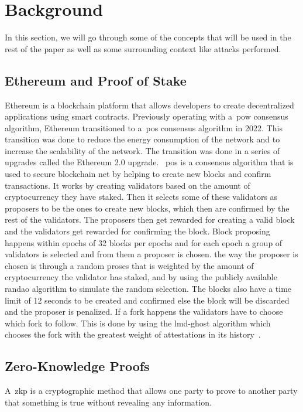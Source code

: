 
\section{Background}\label{sec:background}
In this section, we will go through some of the concepts that will be used in the rest of the paper as well as some surrounding context like attacks performed.

\subsection{Ethereum and Proof of Stake}\label{subsec:ethereum-and-proof-of-stake}
Ethereum is a blockchain platform that allows developers to create decentralized applications using smart contracts.
Previously operating with a~\gls{pow} consensus algorithm, Ethereum transitioned to a~\gls{pos} consensus algorithm in 2022.
This transition was done to reduce the energy consumption of the network and to increase the scalability of the network.
The transition was done in a series of upgrades called the Ethereum 2.0 upgrade.
~\gls{pos} is a consensus algorithm that is used to secure blockchain net by helping to create new blocks and confirm transactions.
It works by creating validators based on the amount of cryptocurrency they have staked.
Then it selects some of these validators as proposers to be the ones to create new blocks, which then are confirmed by the rest of the validators.
The proposers then get rewarded for creating a valid block and the validators get rewarded for confirming the block.
Block proposing happens within epochs of 32 blocks per epochs and for each epoch a group of validators is selected and from them a proposer is chosen.
the way the proposer is chosen is through a random proses that is weighted by the amount of cryptocurrency the validator has staked, and by using the publicly available \gls{randao} algorithm to simulate the random selection.
The blocks also have a time limit of 12 seconds to be created and confirmed else the block will be discarded and the proposer is penalized.
If a fork happens the validators have to choose which fork to follow.
This is done by using the \gls{lmd-ghost} algorithm which chooses the fork with the greatest weight of attestations in its history~\cite{EthereumProof-of-stakePoS}.


\subsection{Zero-Knowledge Proofs}\label{subsec:zero-knowledge-proofs}
A~\gls{zkp} is a cryptographic method that allows one party to prove to another party that something is true without revealing any information.


